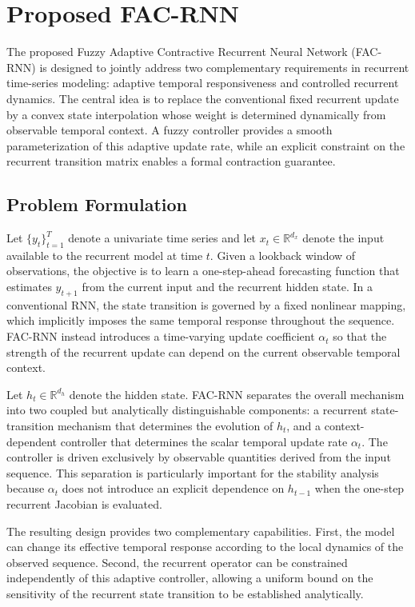\documentclass[journal]{IEEEtran}
\begin{document}
\section{Proposed FAC-RNN}
\label{sec:method}

The proposed Fuzzy Adaptive Contractive Recurrent Neural Network (FAC-RNN) is designed to jointly address two complementary requirements in recurrent time-series modeling: adaptive temporal responsiveness and controlled recurrent dynamics. The central idea is to replace the conventional fixed recurrent update by a convex state interpolation whose weight is determined dynamically from observable temporal context. A fuzzy controller provides a smooth parameterization of this adaptive update rate, while an explicit constraint on the recurrent transition matrix enables a formal contraction guarantee.

\subsection{Problem Formulation}
\label{subsec:formulation}

Let $\{y_t\}_{t=1}^{T}$ denote a univariate time series and let $x_t\in\mathbb{R}^{d_x}$ denote the input available to the recurrent model at time $t$. Given a lookback window of observations, the objective is to learn a one-step-ahead forecasting function that estimates $y_{t+1}$ from the current input and the recurrent hidden state. In a conventional RNN, the state transition is governed by a fixed nonlinear mapping, which implicitly imposes the same temporal response throughout the sequence. FAC-RNN instead introduces a time-varying update coefficient $\alpha_t$ so that the strength of the recurrent update can depend on the current observable temporal context.

Let $h_t\in\mathbb{R}^{d_h}$ denote the hidden state. FAC-RNN separates the overall mechanism into two coupled but analytically distinguishable components: a recurrent state-transition mechanism that determines the evolution of $h_t$, and a context-dependent controller that determines the scalar temporal update rate $\alpha_t$. The controller is driven exclusively by observable quantities derived from the input sequence. This separation is particularly important for the stability analysis because $\alpha_t$ does not introduce an explicit dependence on $h_{t-1}$ when the one-step recurrent Jacobian is evaluated.

The resulting design provides two complementary capabilities. First, the model can change its effective temporal response according to the local dynamics of the observed sequence. Second, the recurrent operator can be constrained independently of this adaptive controller, allowing a uniform bound on the sensitivity of the recurrent state transition to be established analytically.
\end{document}
